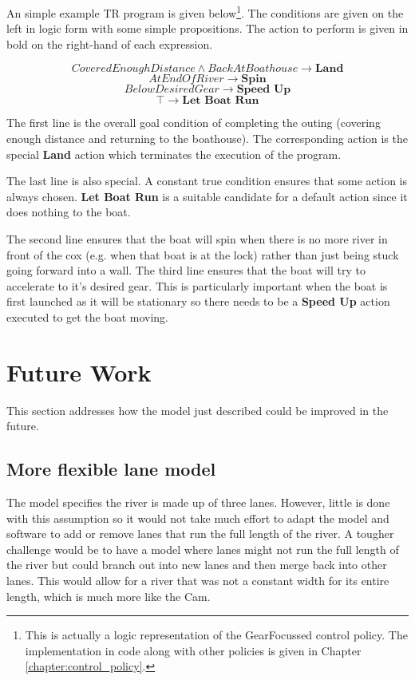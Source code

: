 An simple example TR program is given below\footnote{This is actually a logic representation of the GearFocussed control policy. The implementation in code along with other policies is given in Chapter \ref{chapter:control_policy}.}. The conditions are given on the left in logic form with some simple propositions. The action to perform is given in bold on the right-hand of each expression. 

\[ CoveredEnoughDistance \wedge BackAtBoathouse \to \textbf{Land} \]
\[ AtEndOfRiver \to \textbf{Spin} \]
\[ BelowDesiredGear \to \textbf{Speed Up} \]
\[ \top \to \textbf{Let Boat Run} \]

The first line is the overall goal condition of completing the outing (covering enough distance and returning to the boathouse). The corresponding action is the special \textbf{Land} action which terminates the execution of the program.

The last line is also special. A constant true condition ensures that some action is always chosen. \textbf{Let Boat Run} is a suitable candidate for a default action since it does nothing to the boat.

The second line ensures that the boat will spin when there is no more river in front of the cox (e.g. when that boat is at the lock) rather than just being stuck going forward into a wall. The third line ensures that the boat will try to accelerate to it's desired gear. This is particularly important when the boat is first launched as it will be stationary so there needs to be a \textbf{Speed Up} action executed to get the boat moving.

\section{Future Work}\label{model:future}
This section addresses how the model just described could be improved in the future. 

\subsection{More flexible lane model}\label{model:future:lane}
The model specifies the river is made up of three lanes. However, little is done with this assumption so it would not take much effort to adapt the model and software to add or remove lanes that run the full length of the river. A tougher challenge would be to have a model where lanes might not run the full length of the river but could branch out into new lanes and then merge back into other lanes. This would allow for a river that was not a constant width for its entire length, which is much more like the Cam.

